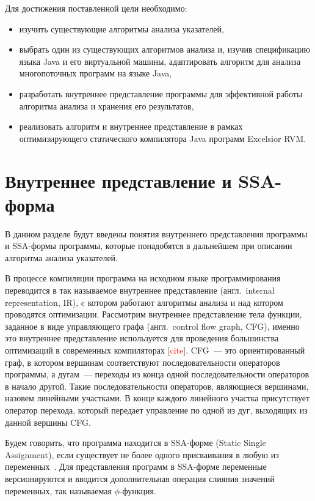\documentclass[14pt,titlepage]{extarticle}
\let\oldphi\phi
\renewcommand{\phi}{\ensuremath{\oldphi}}
\newcommand{\todocite}{[\textcolor{red}{\eng{cite}}]}
\newcommand{\eng}[1]{{\English#1}}
\newcommand{\engdef}[1]{(англ.~\eng{#1})}
\let\oldsection\section
\renewcommand{\section}{\newpage\oldsection}
\begin{document}
    Для достижения поставленной цели необходимо:
    \begin{itemize}
      \item изучить существующие алгоритмы анализа указателей,
      \item выбрать один из существующих алгоритмов анализа и, изучив
            спецификацию языка Java и его виртуальной машины, адаптировать
            алгоритм для анализа многопоточных программ на языке Java,
      \item разработать внутреннее представление программы для эффективной
            работы алгоритма анализа и хранения его результатов,
      \item реализовать алгоритм и внутреннее представление в рамках
            оптимизирующего статического компилятора Java программ
            \eng{Excelsior RVM}.
    \end{itemize}

  \section{Внутреннее представление и SSA-форма}
    \label{section:ir_and_ssa}

    В данном разделе будут введены понятия внутреннего представления программы
    и SSA-формы программы, которые понадобятся в дальнейшем при описании
    алгоритма анализа указателей.

    В процессе компиляции программа на исходном языке программирования
    переводится в так называемое внутреннее представление
    \engdef{internal representation, IR}, c котором работают
    алгоритмы анализа и над котором проводятся оптимизации.
    Рассмотрим внутреннее представление тела функции, заданное в виде
    управляющего графа \engdef{control flow graph, CFG}, именно это
    внутреннее представление используется для проведения большинства
    оптимизаций в современных компиляторах \todocite.
    CFG~--- это ориентированный граф, в котором вершинам соответствуют
    последовательности операторов программы, а дугам~--- переходы из конца
    одной последовательности операторов в начало другой. Такие
    последовательности операторов, являющиеся вершинами, назовем линейными
    участками. В конце каждого линейного участка присутствует оператор
    перехода, который передает управление по одной из дуг, выходящих из
    данной вершины CFG.

    Будем говорить, что программа находится в SSA-форме (\eng{Static Single
    Assignment}), если существует не более одного присваивания в любую из
    переменных~\cite{ssa}.
    Для представления программ в SSA-форме переменные версионируются и
    вводится дополнительная операция слияния значений переменных, так
    называемая \phi-функция.
\end{document}
